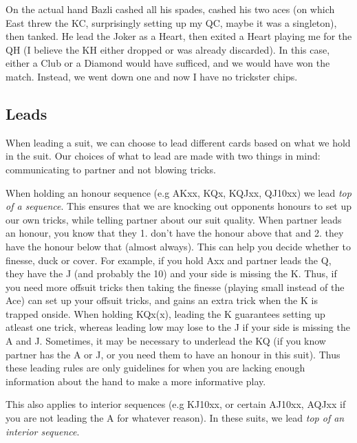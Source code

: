 \documentclass[a4paper]{report}
\theoremstyle{question}
\theoremstyle{theorem}
\theoremstyle{definition}
\newcommand{\<}{\left\langle}%
\renewcommand{\>}{\right\rangle}%
\begin{document}
On the actual hand Bazli cashed all his spades, cashed his two aces (on which East threw the KC, surprisingly setting up my QC, maybe it was a singleton), then tanked. He lead the Joker as a Heart, then exited a Heart playing me for the QH (I believe the KH either dropped or was already discarded). In this case, either a Club or a Diamond would have sufficed, and we would have won the match. Instead, we went down one and now I have no trickster chips.


\subsection*{Leads}

When leading a suit, we can choose to lead different cards based on what we hold in the suit. Our choices of what to lead are made with two things in mind: communicating to partner and not blowing tricks. 

When holding an honour sequence (e.g AKxx, KQx, KQJxx, QJ10xx) we lead \textit{top of a sequence}. This ensures that we are knocking out opponents honours to set up our own tricks, while telling partner about our suit quality. When partner leads an honour, you know that they 1. don't have the honour above that and 2. they have the honour below that (almost always). This can help you decide whether to finesse, duck or cover. For example, if you hold Axx and partner leads the Q, they have the J (and probably the 10) and your side is missing the K. Thus, if you need more offsuit tricks then taking the finesse (playing small instead of the Ace) can set up your offsuit tricks, and gains an extra trick when the K is trapped onside. When holding KQx(x), leading the K guarantees setting up atleast one trick, whereas leading low may lose to the J if your side is missing the A and J. Sometimes, it may be necessary to underlead the KQ (if you know partner has the A or J, or you need them to have an honour in this suit). Thus these leading rules are only guidelines for when you are lacking enough information about the hand to make a more informative play.


This also applies to interior sequences (e.g KJ10xx, or certain AJ10xx, AQJxx if you are not leading the A for whatever reason). In these suits, we lead \textit{top of an interior sequence}.
\end{document}

